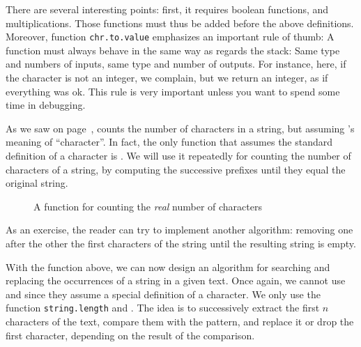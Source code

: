 There are several interesting points: first, it requires boolean functions,
and multiplications. Those functions must thus be added before the above
definitions. Moreover, function \verb+chr.to.value+ emphasizes an important
rule of thumb: A function must always behave in the same way as regards the
stack: Same type and numbers of inputs, same type and number of outputs. For
instance, here, if the character is not an integer, we complain, but we return
an integer, as if everything was ok. This rule is very important unless you
want to spend some time in debugging.



As we saw on page~\pageref{textlength},  counts the number of
characters in a string, but assuming \bt's meaning of ``character''. 
In fact, the only function that assumes the standard definition of a character
is . We will use it repeatedly for counting the number of
characters of a string, by computing the successive prefixes until they equal
the original string.

\begin{figure}[!htbp]
\begin{myexv}
\end{myexv} %
\caption{A function for counting the \emph{real} number of characters}\label{fig4}
\end{figure}

As an exercise, the reader can try to implement another algorithm: removing
one after the other the first characters of the string until the resulting
string is empty.


With the function above, we can now design an algorithm for searching and
replacing the occurrences of a string in a given text. Once again, we cannot
use  and  since they assume a special
definition of a character. We only use the function \verb+string.length+ and
. The idea is to successively extract the first $n$ characters
of the text, compare them with the pattern, and replace it or drop the first
character, depending on the result of the comparison.

